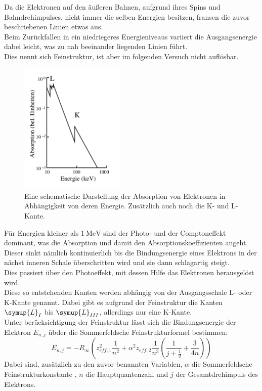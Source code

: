 \noindent Da die Elektronen auf den äußeren Bahnen, aufgrund ihres Spins und Bahndrehimpulses, nicht immer die selben Energien besitzen, fransen die zuvor beschriebenen Linien etwas aus.\\
Beim Zurückfallen in ein niedriegeres Energieniveaus variiert die Ausgangsenergie dabei leicht, was zu nah beeinander liegenden Linien führt.\\
Dies nennt sich Feinstruktur, ist aber im folgenden Versuch nicht auflösbar.\\
\begin{figure}
    \centering
    \includegraphics[width=5cm]{latex/images/absorption.PNG}
    \caption{Eine schematische Darstellung der Absorption von Elektronen in Abhängigkeit von deren Energie. Zusätzlich auch noch die K- und L-Kante\protect \cite{V602}.}
    \label{img:comp}
\end{figure}
Für Energien kleiner als $\SI{1}{\mega\eV}$ sind der Photo- und der Comptoneffekt dominant, was die Absorption und damit den Absorptionskoeffizienten angeht.\\
Dieser sinkt nämlich kontinuierlich bis die Bindungsenergie eines Elektrons in der nächst inneren Schale überschritten wird und sie dann schlagartig steigt.\\
Dies passiert über den Photoeffekt, mit dessen Hilfe das Elektronen herausgelöst wird.\\ 
Diese so entstehenden Kanten werden abhängig von der Ausgangsschale L- oder K-Kante genannt. Dabei gibt es aufgrund der Feinstruktur die Kanten $\symup{L}_{I}$ bis $\symup{L}_{III}$, allerdings nur eine K-Kante.\\
Unter berücksichtigung der Feinstruktur lässt sich die Bindungsenergie der Elektron $E_{n,j}$ übder die Sommerfeldsche Feinstrukturformel bestimmen:
\begin{equation*}
    E_{n,j}= -R_\infty \left( z_{eff,1}^2 \frac{1}{n^2}+ \alpha^2   z_{eff,2}\frac{1}{n^3} \left( \frac{1}{j+ \frac{1}{2}} + \frac{3}{4n}   \right)   \right)
\end{equation*}
Dabei sind, zusätzlich zu den zuvor benannten Variablen, $\alpha$ die Sommerfeldsche Feinstrukturkonstante \cite{sommer}, $n$ die Hauptquantenzahl und $j$ der Gesamtdrehimpuls des Elektrons.\\





